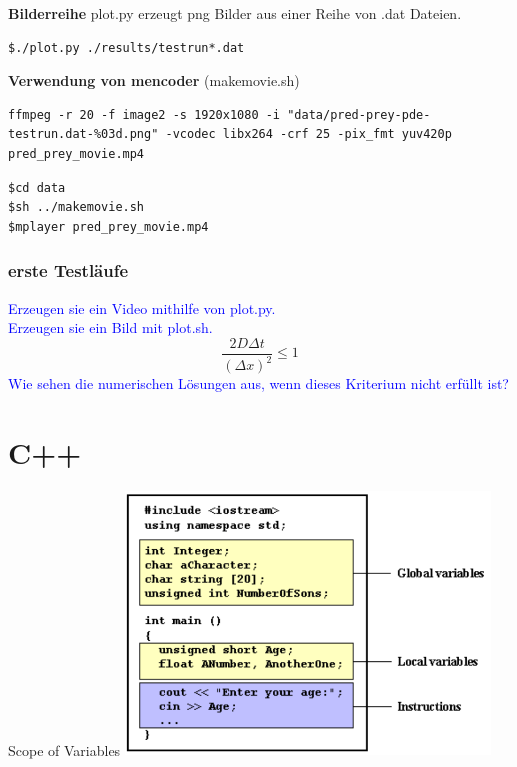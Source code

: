\documentclass[10pt]{beamer}
\begin{document}
% 
% 
% 
\begin{frame}[fragile]
\textbf{Bilderreihe}
plot.py erzeugt png Bilder aus einer Reihe von .dat Dateien.
\begin{lstlisting}
$./plot.py ./results/testrun*.dat
\end{lstlisting}
\vspace{3pt}
\textbf{Verwendung von mencoder} (makemovie.sh)
\begin{lstlisting}
ffmpeg -r 20 -f image2 -s 1920x1080 -i "data/pred-prey-pde-testrun.dat-%03d.png" -vcodec libx264 -crf 25 -pix_fmt yuv420p pred_prey_movie.mp4
\end{lstlisting}

\begin{lstlisting}
$cd data
$sh ../makemovie.sh
$mplayer pred_prey_movie.mp4
\end{lstlisting}
\end{frame}


\frame
{
  \frametitle{erste Testläufe}
\textcolor{blue} {Erzeugen sie ein Video mithilfe von plot.py.}\\
\textcolor{blue} {Erzeugen sie ein Bild mit plot.sh.}\newline\newline
$$\frac{2 D \Delta t}{\left(\Delta x\right)^2}\leq 1$$
\textcolor{blue} {Wie sehen die numerischen Lösungen aus, wenn dieses Kriterium nicht erfüllt ist?}
}



\section{C++}

\begin{frame}{Scope of Variables}
\includegraphics[height=7cm]{img/scope_of_variables.pdf} 
\end{frame}
\end{document}
